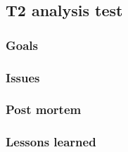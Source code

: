 

\subsection{T2 analysis test}
\label{sec:test:t2}

\subsubsection{Goals}
\label{sec:test:t2:goals}

\subsubsection{Issues}
\label{sec:test:t2:Issues}

\subsubsection{Post mortem}
\label{sec:test:t2:postmortem}

\subsubsection{Lessons learned}
\label{sec:test:t2:lessons}
